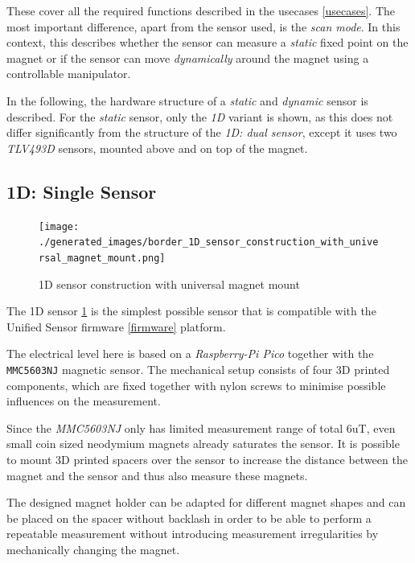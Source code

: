 These cover all the required functions described in the usecases
\ref{usecases}. The most important difference, apart from the sensor
used, is the \emph{scan mode}. In this context, this describes whether
the sensor can measure a \emph{static} fixed point on the magnet or if
the sensor can move \emph{dynamically} around the magnet using a
controllable manipulator.

In the following, the hardware structure of a \emph{static} and
\emph{dynamic} sensor is described. For the \emph{static} sensor, only
the \emph{1D} variant is shown, as this does not differ significantly
from the structure of the \emph{1D: dual sensor}, except it uses two
\emph{TLV493D} sensors, mounted above and on top of the magnet.

\hypertarget{d-single-sensor}{%
\subsection{1D: Single Sensor}\label{d-single-sensor}}

\begin{figure}
\centering
\texttt{[image: ./generated\_images/border\_1D\_sensor\_construction\_with\_universal\_magnet\_mount.png]}
\caption{1D sensor construction with universal magnet mount
\label{1D_sensor_construction_with_universal_magnet_mount.png}}
\end{figure}

The 1D sensor
\ref{1D_sensor_construction_with_universal_magnet_mount.png} is the
simplest possible sensor that is compatible with the Unified Sensor
firmware \ref{firmware} platform.

The electrical level here is based on a \emph{Raspberry-Pi Pico}
together with the \passthrough{\lstinline!MMC5603NJ!} magnetic sensor.
The mechanical setup consists of four 3D printed components, which are
fixed together with nylon screws to minimise possible influences on the
measurement.

Since the \emph{MMC5603NJ} only has limited measurement range of total
6uT, even small coin sized neodymium magnets already saturates the
sensor. It is possible to mount 3D printed spacers over the sensor to
increase the distance between the magnet and the sensor and thus also
measure these magnets.

The designed magnet holder can be adapted for different magnet shapes
and can be placed on the spacer without backlash in order to be able to
perform a repeatable measurement without introducing measurement
irregularities by mechanically changing the magnet.

